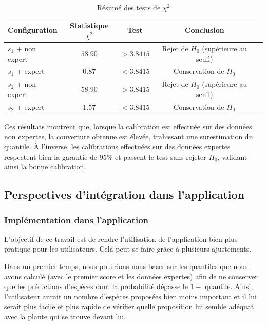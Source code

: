 \documentclass[a4paper,12pt]{article}
\begin{document}
\begin{table}[H]
    \centering
    \begin{tabular}{|l|c|c|c|c|}
        \hline
        \textbf{Configuration} & \textbf{Statistique $\chi^2$} & \textbf{Test} & \textbf{Conclusion} \\
        \hline
        $s_1$ + non expert & $58.90$ & $> 3.8415$ & Rejet de $H_0$ (supérieure au seuil) \\
        $s_1$ + expert & $0.87$ & $< 3.8415$  & Conservation de $H_0$ \\
        $s_2$ + non expert & $58.90$ & $> 3.8415$ & Rejet de $H_0$ (supérieure au seuil) \\
        $s_2$ + expert & $1.57$ & $< 3.8415$ & Conservation de $H_0$ \\
        \hline
    \end{tabular}
    \caption{Résumé des tests de $\chi^2$}
    \label{tab:Tests du Chi-2}
\end{table}

Ces résultats montrent que, lorsque la calibration est effectuée sur des données non expertes, la couverture obtenue est élevée, trahissant une surestimation du quantile. À l’inverse, les calibrations effectuées sur des données expertes respectent bien la garantie de $95\%$ et passent le test sans rejeter $H_0$, validant ainsi la bonne calibration.

\subsection{Perspectives d'intégration dans l'application}

\subsubsection{Implémentation dans l'application}

L'objectif de ce travail est de rendre l'utilisation de l'application bien plus pratique pour les utilisateurs. Cela peut se faire grâce à plusieurs ajustements.

\vspace{0.2cm}

Dans un premier temps, nous pourrions nous baser sur les quantiles que nous avons calculé (avec le premier score et les données expertes) afin de ne conserver que les prédictions d'espèces dont la probabilité dépasse le $1 -$ quantile. Ainsi, l'utilisateur aurait un nombre d'espèces proposées bien moins important et il lui serait plus facile et plus rapide de vérifier quelle proposition lui semble adéquat avec la plante qui se trouve devant lui.
\end{document}
